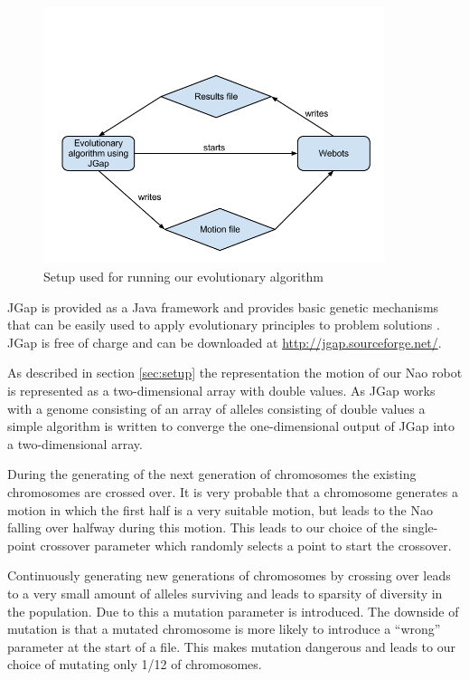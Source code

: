 \documentclass[a4paper,10pt]{article}
\begin{document}
\begin{figure}[h!]
\includegraphics[width=100mm]{images/jgapSetup}
\caption{Setup used for running our evolutionary algorithm}
\label{fig:jgapsetup}
\end{figure}

JGap is provided as a Java framework and provides basic genetic mechanisms that can be easily used to apply evolutionary principles to problem solutions \cite{jgap}. JGap is free of charge and can be downloaded at \url{http://jgap.sourceforge.net/}. 

As described in section \ref{sec:setup} the representation the motion of our Nao robot is represented as a two-dimensional array with double values. As JGap works with a genome consisting of an array of alleles consisting of double values a simple algorithm is written to converge the one-dimensional output of JGap into a two-dimensional array. 

During the generating of the next generation of chromosomes the existing chromosomes are crossed over. It is very probable that a chromosome generates a motion in which the first half is a very suitable motion, but leads to the Nao falling over halfway during this motion. This leads to our choice of the single-point crossover parameter which randomly selects a point to start the crossover. 

Continuously generating new generations of chromosomes by crossing over leads to a very small amount of alleles surviving and leads to sparsity of diversity in the population. Due to this a mutation parameter is introduced. The downside of mutation is that a mutated chromosome is more likely to introduce a “wrong” parameter at the start of a file. This makes mutation dangerous and leads to our choice of mutating only 1/12 of chromosomes. 
\end{document}
